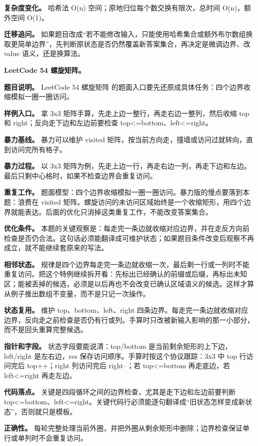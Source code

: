 \textbf{复杂度变化。} 哈希法 O(n) 空间；原地归位每个数交换有限次，总时间 O(n)，额外空间 O(1)。

\textbf{迁移追问。} 如果题目改成“若不能修改输入，只能使用哈希集合或额外布尔数组换取更简单边界”，先判断原状态是否仍然覆盖新答案集合，再决定是微调边界、改 value 语义，还是换算法。

\noindent\textbf{LeetCode 54 螺旋矩阵。}

\textbf{题目说明。} LeetCode 54 螺旋矩阵 的题面入口要先还原成具体任务：四个边界收缩模拟一圈一圈访问。

\textbf{样例入口。} 拿 3x3 矩阵手算，先走上边一整行，再走右边一整列，然后收缩 top 和 right；反向走下边和左边前要检查 top<=bottom、left<=right。

\textbf{暴力基线。} 暴力可以维护 visited 矩阵，按当前方向走，撞墙或访问过就转向，直到访问完所有格子。

\textbf{暴力过程。} 以 3x3 矩阵为例，先走上边一行，再走右边一列，再走下边和左边。最后只剩中心格时，如果不检查边界会重复访问。

\textbf{重复工作。} 题面模型：四个边界收缩模拟一圈一圈访问。暴力版的慢点要落到本题：浪费在 visited 矩阵。螺旋访问的未访问区域始终是一个收缩矩形，用四个边界就能表达。后面的优化只消掉这类重复工作，不能改变答案集合。

\textbf{优化条件。} 本题的关键观察是：每走完一条边就收缩对应边界，并在走反方向前检查是否仍合法。这句话必须能翻译成可维护状态；如果题目条件改变后观察不再成立，就不能继续套原来的写法。

\textbf{相邻状态。} 规律是四个边界每走完一条边就收缩一次，最后剩一行或一列时不能重复访问。把这个特例继续拆开看：先标出已经确认的前缀或后缀，再标出未知区；能被丢掉的候选，必须是以后再也不会改变已确认区域语义的候选。这样才算从例子推出数组不变量，而不是只记一次操作。

\textbf{状态复用。} 维护 top、bottom、left、right 四条边界。每走完一条边就收缩对应边界，反向走之前检查是否仍有行或列。手算时只改被新输入影响的那一小部分，而不是回头重算完整候选。

\textbf{指针和字段。} 状态字段要能说清：top/bottom 是当前剩余矩形的上下边，left/right 是左右边，res 保存访问顺序。手算时按这个协议跟踪：3x3 中 top 行访问完后 top++；right 列访问完后 right--；若 top<=bottom 再走底边，若 left<=right 再走左边。

\textbf{代码落点。} 关键是四段循环之间的边界检查，尤其是走下边和左边前要判断 top<=bottom、left<=right。关键代码行必须能逐句翻译成“旧状态怎样变成新状态”，否则就只是模板。

\textbf{正确性。} 每轮完整处理当前外圈，并把外圈从剩余矩形中删除；边界检查保证单行或单列时不会重复访问。


